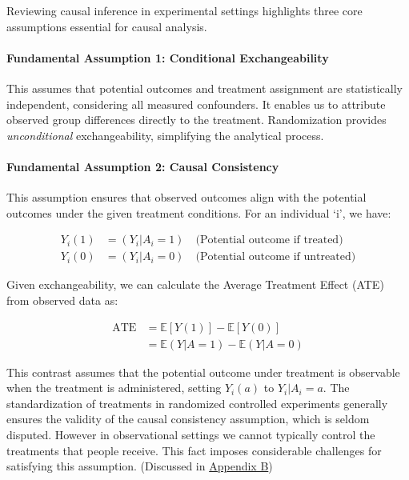 \documentclass[
  singlecolumn]{article}
\let\oldparagraph\paragraph
\renewcommand{\paragraph}[1]{\oldparagraph{#1}\mbox{}}
\begin{document}
Reviewing causal inference in experimental settings highlights three
core assumptions essential for causal analysis.

\paragraph{Fundamental Assumption 1: Conditional
Exchangeability}\label{fundamental-assumption-1-conditional-exchangeability}

This assumes that potential outcomes and treatment assignment are
statistically independent, considering all measured confounders. It
enables us to attribute observed group differences directly to the
treatment. Randomization provides \emph{unconditional} exchangeability,
simplifying the analytical process.

\paragraph{Fundamental Assumption 2: Causal
Consistency}\label{fundamental-assumption-2-causal-consistency}

This assumption ensures that observed outcomes align with the potential
outcomes under the given treatment conditions. For an individual `i', we
have:

\[
\begin{aligned}
Y_{i}(1) &= (Y_{i}|A_{i} = 1) \quad \text{(Potential outcome if treated)} \\
Y_{i}(0) &= (Y_{i}|A_{i} = 0) \quad \text{(Potential outcome if untreated)}
\end{aligned}
\]

Given exchangeability, we can calculate the Average Treatment Effect
(ATE) from observed data as:

\[
\begin{aligned}
\text{ATE} &= \mathbb{E}[Y(1)] - \mathbb{E}[Y(0)] \\
&= \mathbb{E}(Y|A=1) - \mathbb{E}(Y|A=0)
\end{aligned}
\]

This contrast assumes that the potential outcome under treatment is
observable when the treatment is administered, setting \(Y_i(a)\) to
\(Y_i|A_i=a\). The standardization of treatments in randomized
controlled experiments generally ensures the validity of the causal
consistency assumption, which is seldom disputed. However in
observational settings we cannot typically control the treatments that
people receive. This fact imposes considerable challenges for satisfying
this assumption. (Discussed in \hyperref[appendix-b]{Appendix B})
\end{document}
